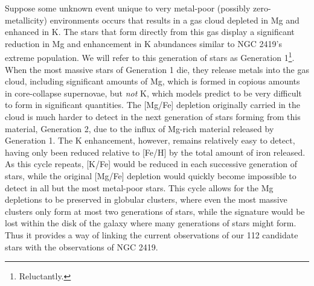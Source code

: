 \documentclass[a4paper,fleqn,usenatbib]{mnras}
\newcommand{\todo}[1]{\textcolor{red}{#1}}
\begin{document}
Suppose some unknown event unique to very metal-poor (possibly zero-metallicity) environments occurs that results in a gas cloud depleted in Mg and enhanced in K. The stars that form directly from this gas display a significant reduction in Mg and enhancement in K abundances similar to NGC 2419's extreme population. We will refer to this generation of stars as Generation 1\footnote{Reluctantly.}. When the most massive stars of Generation 1 die, they release metals into the gas cloud, including significant amounts of Mg, which is formed in copious amounts in core-collapse supernovae, but \textit{not} K, which models predict to be very difficult to form in significant quantities. The [Mg/Fe] depletion originally carried in the cloud is much harder to detect in the next generation of stars forming from this material, Generation 2, due to the influx of Mg-rich material released by Generation 1. The K enhancement, however, remains relatively easy to detect, having only been reduced relative to [Fe/H] by the total amount of iron released. As this cycle repeats, [K/Fe] would be reduced in each successive generation of stars, while the original [Mg/Fe] depletion would quickly become impossible to detect in all but the most metal-poor stars. This cycle allows for the Mg depletions to be preserved in globular clusters, where even the most massive clusters only form at most two generations of stars, while the signature would be lost within the disk of the galaxy where many generations of stars might form. Thus it provides a way of linking the current observations of our 112 candidate stars with the observations of NGC 2419. 

\end{document}
